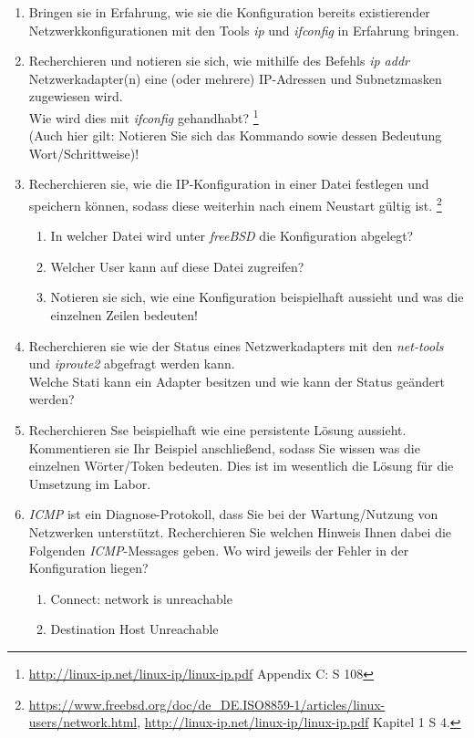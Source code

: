 \documentclass[paper=a4,fontsize=11pt]{scrartcl}%
\numberwithin{equation}{section}
\begin{document}
\begin{enumerate}
 	\item Bringen sie in Erfahrung, wie sie die Konfiguration bereits existierender Netzwerkkonfigurationen mit den Tools \emph{ip} und \emph{ifconfig} in Erfahrung bringen.
	\item Recherchieren und notieren sie sich, wie mithilfe des Befehls \emph{ip addr} Netzwerkadapter(n) eine (oder mehrere) IP-Adressen und Subnetzmasken zugewiesen wird.\\
	Wie wird dies mit \emph{ifconfig} gehandhabt? \footnote{\url{http://linux-ip.net/linux-ip/linux-ip.pdf} Appendix C: S 108}\\
	(Auch hier gilt: Notieren Sie sich das Kommando sowie dessen Bedeutung Wort/Schrittweise)!
	\item Recherchieren sie, wie die IP-Konfiguration in einer Datei festlegen und speichern können, sodass diese weiterhin nach einem Neustart gültig ist.  \footnote{\url{https://www.freebsd.org/doc/de_DE.ISO8859-1/articles/linux-users/network.html}, \url{http://linux-ip.net/linux-ip/linux-ip.pdf} Kapitel 1 S 4.}
	\begin{enumerate}
		\item In welcher Datei wird unter \emph{freeBSD} die Konfiguration abgelegt?
		\item Welcher User kann auf diese Datei zugreifen?
		\item Notieren sie sich, wie eine Konfiguration beispielhaft aussieht und was die einzelnen Zeilen bedeuten!
	\end{enumerate}
	\item Recherchieren sie wie der Status eines Netzwerkadapters mit den \emph{net-tools} und \emph{iproute2} abgefragt werden kann.\\
	Welche Stati kann ein Adapter besitzen und wie kann der Status geändert werden?
	\item Recherchieren Sse beispielhaft wie eine persistente Lösung aussieht. Kommentieren sie 	Ihr Beispiel anschließend, sodass Sie wissen was die einzelnen Wörter/Token bedeuten. Dies ist im wesentlich die Lösung für die Umsetzung im Labor.
	\item \emph{ICMP} ist ein Diagnose-Protokoll, dass Sie bei der Wartung/Nutzung von Netzwerken unterstützt. Recherchieren Sie welchen Hinweis Ihnen dabei die Folgenden \emph{ICMP}-Messages geben. Wo wird jeweils der Fehler in der Konfiguration liegen?
	\begin{enumerate}
		\item Connect: network is unreachable
		\item Destination Host Unreachable

\end{enumerate}
\end{enumerate}
\end{document}
